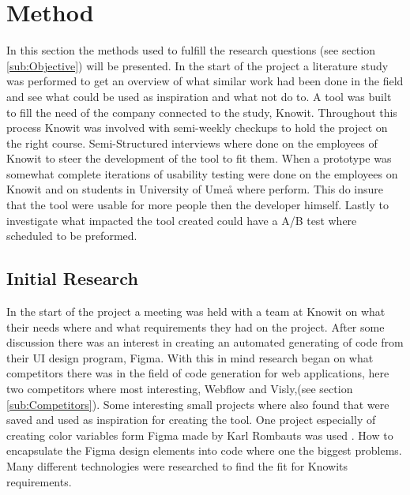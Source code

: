 \section{Method}

In this section the methods used to fulfill the research questions (see section \ref{sub:Objective}) will be presented. In the start of the project a literature study was performed to get an overview of what similar work had been done in the field and see what could be used as inspiration and what not do to. A tool was built to fill the need of the company connected to the study, Knowit. Throughout this process Knowit was involved with semi-weekly checkups to hold the project on the right course. Semi-Structured interviews where done on the employees of Knowit to steer the development of the tool to fit them. When a prototype was somewhat complete iterations of usability testing were done on the employees on Knowit and on students in University of Umeå where perform. This do insure that the tool were usable for more people then the developer himself. Lastly to investigate what impacted the tool created could have a A/B test where scheduled to be preformed.

\subsection{Initial Research}%
\label{sub:Initial Research}

In the start of the project a meeting was held with a team at Knowit on what their needs where and what requirements they had on the project. After some discussion there was an interest in creating an automated generating of code from their UI design program, Figma. With this in mind research began on what competitors there was in the field of code generation for web applications, here two competitors where most interesting, Webflow and Visly,(see section \ref{sub:Competitors}). Some interesting small projects where also found that were saved and used as inspiration for creating the tool. One project especially of creating color variables form Figma made by Karl Rombauts was used \cite{rombautsKarlRombautsFigmaSCSSGenerator2021}. How to encapsulate the Figma design elements into code where one the biggest problems. Many different technologies were researched to find the fit for Knowits requirements.


